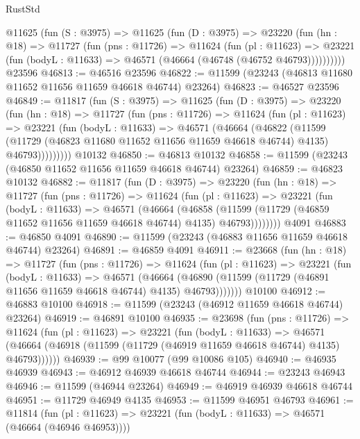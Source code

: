 \begin{lexlean}{RustStd}
\begin{coremodule}
    @11625
      (fun (S : @3975) =>
      @11625
        (fun (D : @3975) =>
        @23220
          (fun (hn : @18) =>
          @11727
            (fun (pns : @11726) =>
            @11624
              (fun (pl : @11623) =>
              @23221 (fun (bodyL : @11633) => @46571 (@46664 (@46748 (@46752 @46793))))))))))
    @23596
@46813 := @46516 @23596
@46822 := @11599 (@23243 (@46813 @11680 @11652 @11656 @11659 @46618 @46744) @23264)
@46823 := @46527 @23596
@46849 := @11817
    (fun (S : @3975) =>
    @11625
      (fun (D : @3975) =>
      @23220
        (fun (hn : @18) =>
        @11727
          (fun (pns : @11726) =>
          @11624
            (fun (pl : @11623) =>
            @23221
              (fun (bodyL : @11633) =>
              @46571
                (@46664
                  (@46822
                    (@11599
                      (@11729 (@46823 @11680 @11652 @11656 @11659 @46618 @46744) @4135)
                      @46793)))))))))
    @10132
@46850 := @46813 @10132
@46858 := @11599 (@23243 (@46850 @11652 @11656 @11659 @46618 @46744) @23264)
@46859 := @46823 @10132
@46882 := @11817
    (fun (D : @3975) =>
    @23220
      (fun (hn : @18) =>
      @11727
        (fun (pns : @11726) =>
        @11624
          (fun (pl : @11623) =>
          @23221
            (fun (bodyL : @11633) =>
            @46571
              (@46664
                (@46858
                  (@11599 (@11729 (@46859 @11652 @11656 @11659 @46618 @46744) @4135) @46793))))))))
    @4091
@46883 := @46850 @4091
@46890 := @11599 (@23243 (@46883 @11656 @11659 @46618 @46744) @23264)
@46891 := @46859 @4091
@46911 := @23668
    (fun (hn : @18) =>
    @11727
      (fun (pns : @11726) =>
      @11624
        (fun (pl : @11623) =>
        @23221
          (fun (bodyL : @11633) =>
          @46571
            (@46664
              (@46890 (@11599 (@11729 (@46891 @11656 @11659 @46618 @46744) @4135) @46793)))))))
    @10100
@46912 := @46883 @10100
@46918 := @11599 (@23243 (@46912 @11659 @46618 @46744) @23264)
@46919 := @46891 @10100
@46935 := @23698
    (fun (pns : @11726) =>
    @11624
      (fun (pl : @11623) =>
      @23221
        (fun (bodyL : @11633) =>
        @46571 (@46664 (@46918 (@11599 (@11729 (@46919 @11659 @46618 @46744) @4135) @46793))))))
@46939 := @99 @10077 (@99 @10086 @105)
@46940 := @46935 @46939
@46943 := @46912 @46939 @46618 @46744
@46944 := @23243 @46943
@46946 := @11599 (@46944 @23264)
@46949 := @46919 @46939 @46618 @46744
@46951 := @11729 @46949 @4135
@46953 := @11599 @46951 @46793
@46961 := @11814
    (fun (pl : @11623) => @23221 (fun (bodyL : @11633) => @46571 (@46664 (@46946 @46953))))

\end{coremodule}
\end{lexlean}
